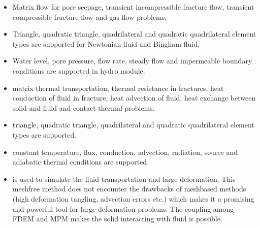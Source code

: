 \documentclass[letterpaper,10pt,english]{sphinxmanual}
\begin{document}
\begin{itemize}
\item {} 
 \sphinxhyphen{}  Matrix flow for pore seepage, transient incompressible fracture flow, transient compressible fracture flow and gas flow problems.

\item {} 
 \sphinxhyphen{} Triangle, quadratic triangle, quadrilateral and quadratic quadrilateral element types are supported for Newtonian fluid and Bingham fluid.

\item {} 
 \sphinxhyphen{} Water level, pore pressure, flow rate, steady flow and impermeable boundary conditions are supported in hydro module.

\end{itemize}

\begin{itemize}
\item {} 
 \sphinxhyphen{} matrix thermal transportation, thermal resistance in fractures, heat conduction of fluid in fracture, heat advection of fluid, heat exchange between solid and fluid and contact thermal problems.

\item {} 
 \sphinxhyphen{} triangle, quadratic triangle, quadrilateral and quadratic quadrilateral element types are supported.

\item {} 
 \sphinxhyphen{} constant temperature, flux, conduction, advection, radiation, source and adiabatic thermal conditions are supported.

\end{itemize}

\begin{itemize}
\item {} 
 is used to simulate the fluid transportation and large deformation. This mesh\sphinxhyphen{}free method does not encounter the drawbacks of mesh\sphinxhyphen{}based methods (high deformation tangling, advection errors etc.) which makes it a promising and powerful tool for large deformation problems. The coupling among FDEM and MPM makes the solid interacting with fluid is possible.

\end{itemize}
\end{document}
